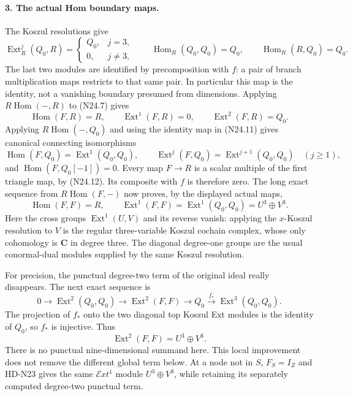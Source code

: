 \paragraph{3. The actual Hom boundary maps.}
The Koszul resolutions give
\[
 \operatorname{Ext}_R^j(Q_0,R)=
 \begin{cases}Q_0,&j=3,\\0,&j\ne3,\end{cases}
 \qquad
 \operatorname{Hom}_R(Q_0,Q_0)=Q_0,
 \qquad \operatorname{Hom}_R(R,Q_0)=Q_0.                    \tag{N24.11}
\]
The last two modules are identified by precomposition with
$f$: a pair of branch multiplication maps restricts to that
same pair. In particular this map is the identity, not a
vanishing boundary presumed from dimensions. Applying
$R\operatorname{Hom}(-,R)$ to (N24.7) gives
\[
 \operatorname{Hom}(F,R)=R,\qquad
 \operatorname{Ext}^1(F,R)=0,\qquad
 \operatorname{Ext}^2(F,R)=Q_0.                             \tag{N24.12}
\]
Applying $R\operatorname{Hom}(-,Q_0)$ and using the identity
map in (N24.11) gives canonical connecting isomorphisms
\[
 \operatorname{Hom}(F,Q_0)=\operatorname{Ext}^1(Q_0,Q_0),
 \qquad
 \operatorname{Ext}^j(F,Q_0)=\operatorname{Ext}^{j+1}(Q_0,Q_0)
                       \quad(j\ge1),                       \tag{N24.13}
\]
and $\operatorname{Hom}(F,Q_0[-1])=0$.
Every map $F\to R$ is a scalar multiple of the first triangle
map, by (N24.12). Its composite with $f$ is therefore zero.
The long exact sequence from $R\operatorname{Hom}(F,-)$ now
proves, by the displayed actual maps,
\[
 \operatorname{Hom}(F,F)=R,\qquad
 \operatorname{Ext}^1(F,F)=\operatorname{Ext}^1(Q_0,Q_0)
                                  =U^3\oplus V^3.          \tag{N24.14}
\]
Here the cross groups $\operatorname{Ext}^1(U,V)$ and its
reverse vanish: applying the $x$-Koszul resolution to $V$
is the regular three-variable Koszul cochain complex, whose
only cohomology is $\mathbf C$ in degree three.
The diagonal degree-one groups are the usual conormal-dual
modules supplied by the same Koszul resolution.

For precision, the punctual degree-two term of the original
ideal really disappears. The next exact sequence is
\[
 0\longrightarrow\operatorname{Ext}^2(Q_0,Q_0)
 \longrightarrow\operatorname{Ext}^2(F,F)\longrightarrow Q_0
 \xrightarrow{f_*}\operatorname{Ext}^3(Q_0,Q_0).            \tag{N24.15}
\]
The projection of $f_*$ onto the two diagonal top Koszul
Ext modules is the identity of $Q_0$, so $f_*$ is injective.
Thus
\[
             \operatorname{Ext}^2(F,F)=U^3\oplus V^3.       \tag{N24.16}
\]
There is no punctual nine-dimensional summand here. This local
improvement does not remove the different global term below.
At a node not in $S$, $F_S=I_Z$ and HD-N23 gives the same
$\mathcal E xt^1$ module $U^3\oplus V^3$, while retaining
its separately computed degree-two punctual term.

